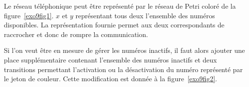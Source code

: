 Le réseau téléphonique peut être représenté par le réseau de Petri coloré de la
figure~\ref{exo9fig1}. $x$ et $y$ représentant tous deux l'ensemble des numéros disponibles. La
représentation fournie permet aux deux correspondants de raccrocher et donc de rompre la
communication. 

Si l'on veut être en mesure de gérer les numéros inactifs, il faut alors ajouter une place
supplémentaire contenant l'ensemble des numéros inactifs et deux transitions permettant l'activation
ou la désactivation du numéro représenté par le jeton de couleur. Cette modification est donnée à la
figure~\ref{exo9fig2}.
